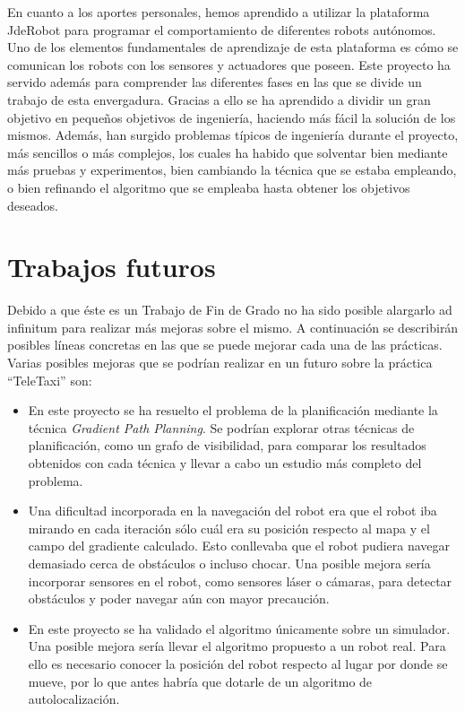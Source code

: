 En cuanto a los aportes personales, hemos aprendido a utilizar la plataforma JdeRobot para programar el comportamiento de diferentes robots autónomos. Uno de los elementos fundamentales de aprendizaje de esta plataforma es cómo se comunican los robots con los sensores y actuadores que poseen. Este proyecto ha servido además para comprender las diferentes fases en las que se divide un trabajo de esta envergadura. Gracias a ello se ha aprendido a dividir un gran objetivo en pequeños objetivos de ingeniería, haciendo más fácil la solución de los mismos. Además, han surgido problemas típicos de ingeniería durante el proyecto, más sencillos o más complejos, los cuales ha habido que solventar bien mediante más pruebas y experimentos, bien cambiando la técnica que se estaba empleando, o bien refinando el algoritmo que se empleaba hasta obtener los objetivos deseados.

\section{Trabajos futuros}
Debido a que éste es un Trabajo de Fin de Grado no ha sido posible alargarlo ad infinitum para realizar más mejoras sobre el mismo. A continuación se describirán posibles líneas concretas en las que se puede mejorar cada una de las prácticas.\\

Varias posibles mejoras que se podrían realizar en un futuro sobre la práctica ``TeleTaxi'' son:

\begin{itemize}
\item En este proyecto se ha resuelto el problema de la planificación mediante la técnica \textit{Gradient Path Planning}. Se podrían explorar otras técnicas de planificación, como un grafo de visibilidad, para comparar los resultados obtenidos con cada técnica y llevar a cabo un estudio más completo del problema.
\item Una dificultad incorporada en la navegación del robot era que el robot iba mirando en cada iteración sólo cuál era su posición respecto al mapa y el campo del gradiente calculado. Esto conllevaba que el robot pudiera navegar demasiado cerca de obstáculos o incluso chocar. Una posible mejora sería incorporar sensores en el robot, como sensores láser o cámaras, para detectar obstáculos y poder navegar aún con mayor precaución.
\item En este proyecto se ha validado el algoritmo únicamente sobre un simulador. Una posible mejora sería llevar el algoritmo propuesto a un robot real. Para ello es necesario conocer la posición del robot respecto al lugar por donde se mueve, por lo que antes habría que dotarle de un algoritmo de autolocalización.
\end{itemize}

